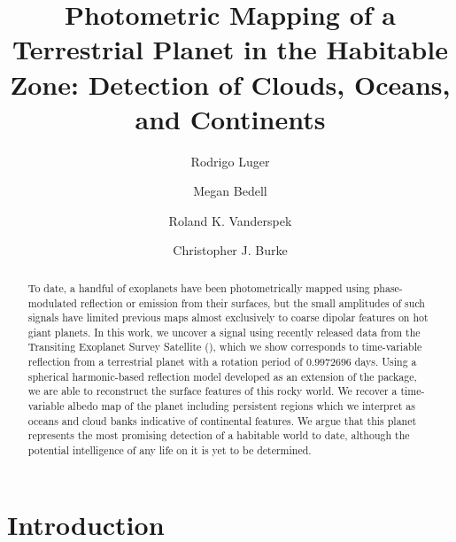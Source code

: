 \documentclass[modern]{aastex62}
\begin{document}

\title{\TESS Photometric Mapping of a Terrestrial Planet in the Habitable Zone: 
       Detection of Clouds, Oceans, and Continents}

\author[0000-0002-0296-3826]{Rodrigo Luger}
%
\author[0000-0002-9328-5652]{Megan Bedell}
%
\author{Roland K. Vanderspek}
%
\author{Christopher J. Burke}

\begin{abstract}
To date, a handful of exoplanets have been photometrically mapped using phase-modulated 
reflection or emission from their surfaces, but the small amplitudes 
of such signals have limited previous maps almost exclusively to coarse dipolar
features on hot giant planets. 
In this work, we uncover a signal using recently released data from the Transiting 
Exoplanet Survey Satellite (\TESS), which we show corresponds to time-variable reflection 
from a terrestrial 
planet with a rotation period of $0.9972696$ days. 
Using a spherical harmonic-based reflection model developed as an extension of 
the \starry package, we are able to reconstruct the surface features of this rocky 
world. We recover a time-variable albedo map of the planet including persistent 
regions which we interpret as oceans and cloud banks indicative of continental features. 
We argue that this planet represents the most promising detection of a habitable 
world to date, although the potential intelligence of any life on it is yet to 
be determined.
\end{abstract}


\section{Introduction}
\label{sec:intro}
\end{document}
